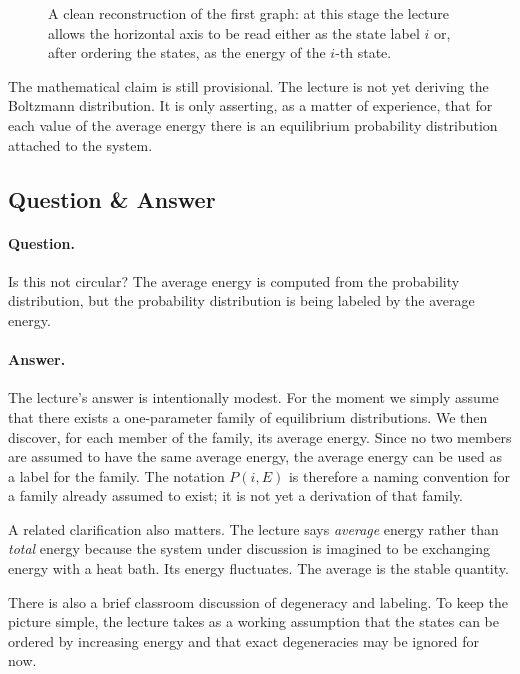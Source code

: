 \begin{figure}[t]
\centering
{}
\caption{A clean reconstruction of the first graph: at this stage the lecture allows the horizontal axis to be read either as the state label \(i\) or, after ordering the states, as the energy of the \(i\)-th state.}
\end{figure}

The mathematical claim is still provisional. The lecture is not yet deriving the Boltzmann distribution. It is only asserting, as a matter of experience, that for each value of the average energy there is an equilibrium probability distribution attached to the system.

\subsection{Question \& Answer}

\paragraph{Question.} Is this not circular? The average energy is computed from the probability distribution, but the probability distribution is being labeled by the average energy.

\paragraph{Answer.} The lecture's answer is intentionally modest. For the moment we simply assume that there exists a one-parameter family of equilibrium distributions. We then discover, for each member of the family, its average energy. Since no two members are assumed to have the same average energy, the average energy can be used as a label for the family. The notation \(P(i,E)\) is therefore a naming convention for a family already assumed to exist; it is not yet a derivation of that family.

A related clarification also matters. The lecture says \emph{average} energy rather than \emph{total} energy because the system under discussion is imagined to be exchanging energy with a heat bath. Its energy fluctuates. The average is the stable quantity.

There is also a brief classroom discussion of degeneracy and labeling. To keep the picture simple, the lecture takes as a working assumption that the states can be ordered by increasing energy and that exact degeneracies may be ignored for now.

